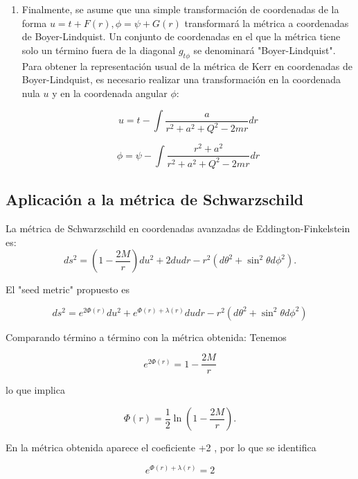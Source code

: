 \begin{enumerate}[1.]
    \item Finalmente, se asume que una simple transformación de coordenadas de la forma $u = t + F(r), \phi = \psi + G(r)$ transformará la métrica a coordenadas de Boyer-Lindquist. Un conjunto de coordenadas en el que la métrica tiene solo un término fuera de la diagonal $g_{t \phi}$ se denominará "Boyer-Lindquist". Para obtener la representación usual de la métrica de Kerr en coordenadas de Boyer-Lindquist, es necesario realizar una transformación en la coordenada nula $u$ y en la coordenada angular $\phi$:

          $$
              u = t - \int \frac{a}{r^2 + a^2 + Q^2 - 2mr} dr
          $$

          $$
              \phi = \psi - \int \frac{r^2 + a^2}{r^2 + a^2 + Q^2 - 2mr} dr
          $$
\end{enumerate}

\subsection{Aplicación a la métrica de Schwarzschild}
La métrica de Schwarzschild en coordenadas avanzadas de Eddington-Finkelstein es:
\begin{equation}
    ds^2=\left(1-\frac{2 M}{r}\right) d u^2+2 d u d r-r^2\left(d \theta^2+\sin ^2 \theta d \phi^2\right) .
\end{equation}

El "seed metric" propuesto es

\begin{equation}
    d s^2=e^{2 \Phi(r)} d u^2+e^{\Phi(r)+\lambda(r)} d u d r-r^2\left(d \theta^2+\sin ^2 \theta d \phi^2\right)
\end{equation}

Comparando término a término con la métrica obtenida:
Tenemos

\begin{equation}
    e^{2 \Phi(r)}=1-\frac{2 M}{r}
\end{equation}

lo que implica

\begin{equation}
    \Phi(r)=\frac{1}{2} \ln \left(1-\frac{2 M}{r}\right) .
\end{equation}

En la métrica obtenida aparece el coeficiente +2 , por lo que se identifica

\begin{equation}
    e^{\Phi(r)+\lambda(r)}=2
\end{equation}

